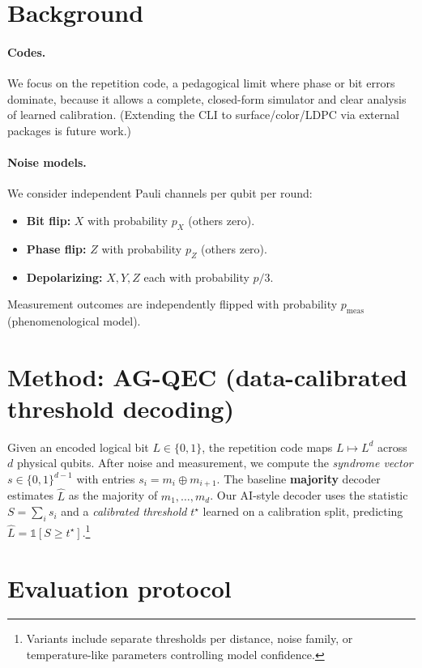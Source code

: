 \documentclass[11pt]{article}
\begin{document}
\section{Background}
\paragraph{Codes.} We focus on the repetition code, a pedagogical limit where phase or bit errors dominate, because it allows a complete, closed-form simulator and clear analysis of learned calibration. (Extending the CLI to surface/color/LDPC via external packages is future work.)

\paragraph{Noise models.} We consider independent Pauli channels per qubit per round:
\begin{itemize}[leftmargin=*]
  \item \textbf{Bit flip:} $X$ with probability $p_X$ (others zero).
  \item \textbf{Phase flip:} $Z$ with probability $p_Z$ (others zero).
  \item \textbf{Depolarizing:} $X,Y,Z$ each with probability $p/3$.
\end{itemize}
Measurement outcomes are independently flipped with probability $p_{\mathrm{meas}}$ (phenomenological model).

\section{Method: AG-QEC (data-calibrated threshold decoding)}
Given an encoded logical bit $L\in\{0,1\}$, the repetition code maps $L \mapsto L^d$ across $d$ physical qubits. After noise and measurement, we compute the \emph{syndrome vector} $s\in\{0,1\}^{d-1}$ with entries $s_i = m_i \oplus m_{i+1}$. 
The baseline \textbf{majority} decoder estimates $\hat L$ as the majority of $m_1,\dots,m_d$.
Our AI-style decoder uses the statistic $S=\sum_i s_i$ and a \emph{calibrated threshold} $t^\star$ learned on a calibration split, predicting $\hat L = \mathbb{1}[S \ge t^\star]$.\footnote{Variants include separate thresholds per distance, noise family, or temperature-like parameters controlling model confidence.}

\section{Evaluation protocol}
\end{document}
